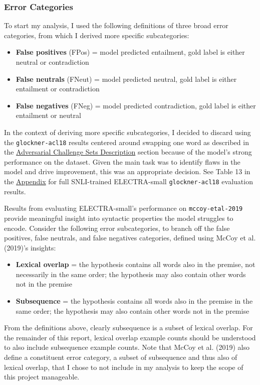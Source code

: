 \documentclass[11pt,a4paper]{article}
\begin{document}
\subsubsection{Error Categories}
\label{sec:ec}
To start my analysis, I used the following definitions of three broad error categories, from which I derived more specific subcategories:

\begin{itemize}
\tiny
  \item \textbf{False positives} (FPos) = model predicted entailment, gold label is either neutral or contradiction
  \item \textbf{False neutrals} (FNeut) = model predicted neutral, gold label is either entailment or contradiction
  \item \textbf{False negatives} (FNeg) = model predicted contradiction, gold label is either entailment or neutral
\end{itemize}

In the context of deriving more specific subcategories, I decided to discard using the \texttt{glockner-acl18} results centered around swapping one word as described in the \hyperref[sec:acsd]{Adversarial Challenge Sets Description} section because of the model's strong performance on the dataset. Given the main task was to identify flaws in the model and drive improvement, this was an appropriate decision. See Table 13 in the \hyperref[sec:appendix]{Appendix} for full SNLI-trained ELECTRA-small \texttt{glockner-acl18} evaluation results.

Results from evaluating ELECTRA-small's performance on \texttt{mccoy-etal-2019} provide meaningful insight into syntactic properties the model struggles to encode. Consider the following error subcategories, to branch off the false positives, false neutrals, and false negatives categories, defined using McCoy et al. (2019)'s insights:
\begin{itemize}
\tiny
  \item \textbf{Lexical overlap} = the hypothesis contains all words also in the premise, not necessarily in the same order; the hypothesis may also contain other words not in the premise
  \item \textbf{Subsequence} = the hypothesis contains all words also in the premise in the same order; the hypothesis may also contain other words not in the premise
\end{itemize}

From the definitions above, clearly subsequence is a subset of lexical overlap. For the remainder of this report, lexical overlap example counts should be understood to also include subsequence example counts. Note that McCoy et al. (2019) also define a constituent error category, a subset of subsequence and thus also of lexical overlap, that I chose to not include in my analysis to keep the scope of this project manageable. 
\end{document}
